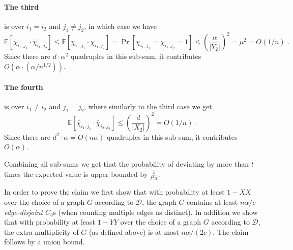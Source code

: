 \documentclass{article}
\newcommand{\Ex}{\mathbb{E}}
\newcommand{\calD}{{\mathcal{D}}}
\newcommand{\commentt}[1]{ {}}
\begin{document}
\paragraph{The third} is over $i_1 = i_2$ and $j_1 \neq j_2$, in which case we have
\begin{equation}\label{eq:cheb-case2}
\Ex[\bar{\chi}_{i_1,j_1}\cdot \bar{\chi}_{i_1,j_2}]
\leq \Ex[\chi_{i_1,j_1}\cdot \chi_{i_1,j_2}] = \Pr[\chi_{i_1,j_1}=\chi_{i_1,j_2}=1]
  \leq \left( \frac{\alpha}{|Y_2|}\right)^2 = \mu^2 = O(1/n)\;.
\end{equation}
\commentt{DR: double check this}
Since there are $d\cdot \alpha^2$ quadruples in this sub-sum, it contributes $O(\alpha \cdot (\alpha/n^{1/2}))$.

\paragraph{The fourth} is over $i_1 \neq i_2$ and $j_1 = j_2$, where similarly to the third case we get
\begin{equation}\label{eq:cheb-case3}
\Ex[\bar{\chi}_{i_1,j_1}\cdot \bar{\chi}_{i_2,j_2}]  %
\leq %
\left( \frac{d}{|X_2|}\right)^2 = O(1/n)\;.
\end{equation}
Since there are $d^2\cdot \alpha = O(n\alpha)$ quadruples in this sub-sum, it contributes $O(\alpha)$.

Combining all sub-sums we get that the probability of deviating by more than $t$ times the expected value is upper bounded by $\frac{1}{t^2 \alpha}$.
\fi






%
\iffalse
In order to prove the claim we first show that with probability at least $1-XX$ over the choice of a graph $G$ according to $\calD$, the graph $G$ contains at least $n\alpha/c$ \emph{edge-disjoint} $C_4$s (when counting multiple edges as distinct).
In addition we show that with probability at least $1-YY$ over the choice of a graph $G$ according to $\calD$,
the extra multiplicity of $G$ (as defined above) is at most $n\alpha/(2c)$.
The claim follows by a union bound.
\end{document}
